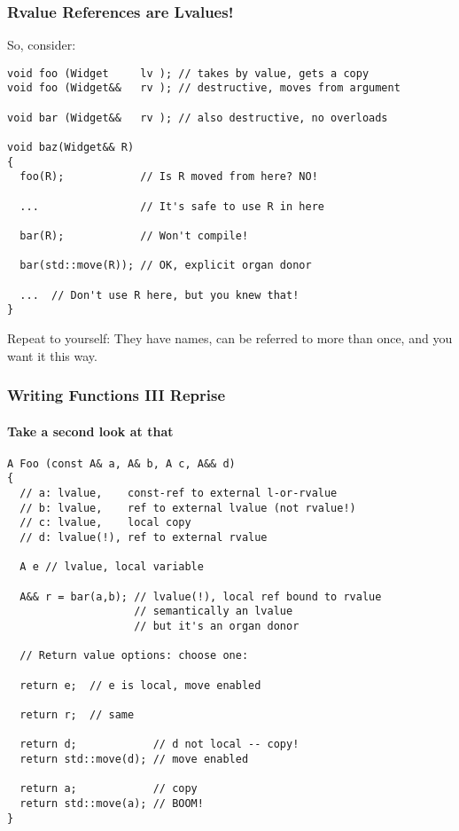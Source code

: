 
\begin{frame}[fragile]
\frametitle{Rvalue References are Lvalues!}
So, consider:
{\scriptsize
\begin{verbatim}
void foo (Widget     lv ); // takes by value, gets a copy
void foo (Widget&&   rv ); // destructive, moves from argument

void bar (Widget&&   rv ); // also destructive, no overloads

void baz(Widget&& R) 
{
  foo(R);            // Is R moved from here? NO!

  ...                // It's safe to use R in here

  bar(R);            // Won't compile!

  bar(std::move(R)); // OK, explicit organ donor

  ...  // Don't use R here, but you knew that!
}
\end{verbatim}
}

Repeat to yourself:  They have
names, can be referred to more than once, and you want it this way.

\end{frame}

\begin{frame}[fragile]
\frametitle{Writing Functions III Reprise}
\framesubtitle{Take a second look at that}
{\scriptsize
\begin{verbatim}
A Foo (const A& a, A& b, A c, A&& d)
{
  // a: lvalue,    const-ref to external l-or-rvalue
  // b: lvalue,    ref to external lvalue (not rvalue!)
  // c: lvalue,    local copy
  // d: lvalue(!), ref to external rvalue

  A e // lvalue, local variable

  A&& r = bar(a,b); // lvalue(!), local ref bound to rvalue
                    // semantically an lvalue
                    // but it's an organ donor

  // Return value options: choose one:

  return e;  // e is local, move enabled

  return r;  // same
  
  return d;            // d not local -- copy!
  return std::move(d); // move enabled

  return a;            // copy
  return std::move(a); // BOOM!
}
\end{verbatim}
}

\end{frame}

